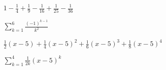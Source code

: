 \documentclass{ximera}
\begin{document}
\begin{question}
\begin{problem}
\end{problem}

\begin{problem}
$1 - \frac{1}{4} + \frac{1}{9} - \frac{1}{16} + \frac{1}{25} - \frac{1}{36}$

\begin{solution}
    $\displaystyle \sum_{k = 1}^{6} \frac{(-1)^{k - 1}}{k^{2}}$
\end{solution}
\end{problem} 

\begin{problem}\label{writesumlast}
$\frac{1}{2}(x - 5) + \frac{1}{4}(x - 5)^{2} + \frac{1}{6}(x - 5)^{3} + \frac{1}{8}(x - 5)^{4}$

\begin{solution}
    $\displaystyle \sum_{k = 1}^{4} \frac{1}{2k}(x - 5)^{k}$
\end{solution}
\end{problem}
  
\end{question}
\end{document}
